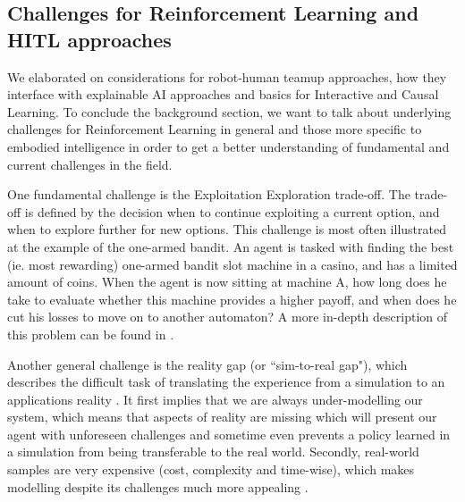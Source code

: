 \documentclass[twoside,11pt]{article}
\begin{document}

\subsection{Challenges for Reinforcement Learning and HITL approaches}

We elaborated on considerations for robot-human teamup approaches, how they interface with explainable AI approaches and basics for Interactive and Causal Learning. To conclude the background section, we want to talk about underlying challenges for Reinforcement Learning in general and those more specific to embodied intelligence in order to get a better understanding of fundamental and current challenges in the field.

One fundamental challenge is the Exploitation Exploration trade-off. The trade-off is defined by the decision when to continue exploiting a current option, and when to explore further for new options. This challenge is most often illustrated at the example of the one-armed bandit. An agent is tasked with finding the best (ie. most rewarding) one-armed bandit slot machine in a casino, and has a limited amount of coins. When the agent is now sitting at machine A, how long does he take to evaluate whether this machine provides a higher payoff, and when does he cut his losses to move on to another automaton? A more in-depth description of this problem can be found in \citet{AudibertMunosSzepesv:2009:ExplorationExploitation}.

Another general challenge is the reality gap (or ``sim-to-real gap"), which describes the difficult task of translating the experience from a simulation to an applications reality \citep{ZagalJavierVallejos:2004:RealityGap}. It first implies that we are always under-modelling our system, which means that aspects of reality are missing which will present our agent with unforeseen challenges and sometime even prevents a policy learned in a simulation from being transferable to the real world. Secondly, real-world samples are very expensive (cost, complexity and time-wise), which makes modelling despite its challenges much more appealing  \cite{KoberBagnellPeters:2013:RLRoboticsSurvey}.
\end{document}
